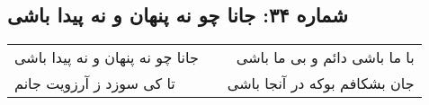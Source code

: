 \begin{center}
\section*{شماره ۳۴: جانا چو نه پنهان و نه پیدا باشی}
\label{sec:034}
\begin{longtable}{l p{0.5cm} r}
جانا چو نه پنهان و نه پیدا باشی
&&
با ما باشی دائم و بی ما باشی
\\
تا کی سوزد ز آرزویت جانم
&&
جان بشکافم بوکه در آنجا باشی
\\
\end{longtable}
\end{center}
